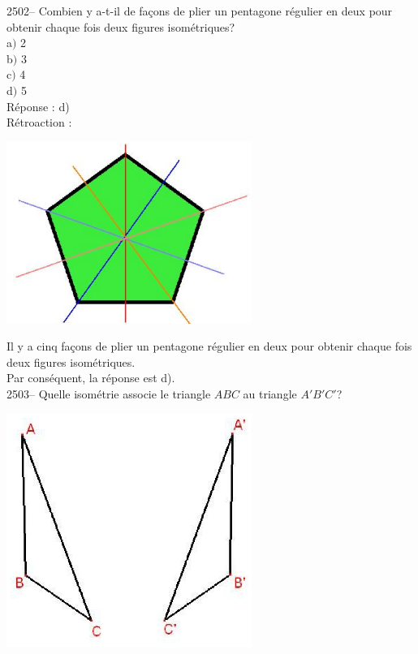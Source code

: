 \documentclass[letterpaper, 12pt]{article}
\begin{document}

2502--  Combien y a-t-il de fa\c cons de plier un pentagone r\'egulier en deux pour obtenir chaque fois deux figures isom\'etriques? \\

a$)$  2 \\
b$)$  3\\
c$)$  4\\
d$)$  5\\

R\'eponse : d)\\

R\'etroaction :\\
\begin{center}
 \includegraphics[width=8cm,bb=14 14 498 328]{Q2502.eps}
\end{center}
Il y a cinq fa\c cons de plier un pentagone r\'egulier en deux pour obtenir chaque fois deux figures isom\'etriques.\\
Par cons\'equent, la r\'eponse est d).\\

2503-- Quelle isom\'etrie associe le triangle $ABC$ au triangle $A'B'C'$?\\
\begin{center}
 \includegraphics[width=8cm,bb=14 14 469 240]{Q2503.eps}
\end{center}
\end{document}
